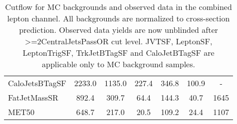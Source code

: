 \begin{table}[!htbp]
\begin{center}
\begin{adjustbox}{max width=\textwidth}
\begin{tabular}{| l | c | c | c | c | c | c |}
CaloJetsBTagSF            &     2233.0      &     1135.0      &      227.4      &      346.8      &      100.9      &      -          \\
FatJetMassSR              &      892.4      &      309.7      &      64.4       &      144.3      &      40.7       &     1645        \\
MET50                     &      648.7      &      217.0      &      20.5       &      109.2      &      24.4       &     1107        \\
\end{tabular}
\end{adjustbox}
\end{center}
\caption{Cutflow for MC backgrounds and observed data in the combined lepton channel. All backgrounds are normalized to cross-section prediction.
Observed data yields are now unblinded after >=2CentralJetsPassOR cut level. JVTSF, LeptonSF, LeptonTrigSF, TrkJetBTagSF and CaloJetBTagSF
are applicable only to MC background samples.}
\label{tab:boosted_cutflow_mcdata_leptonchannel}
\end{table}


